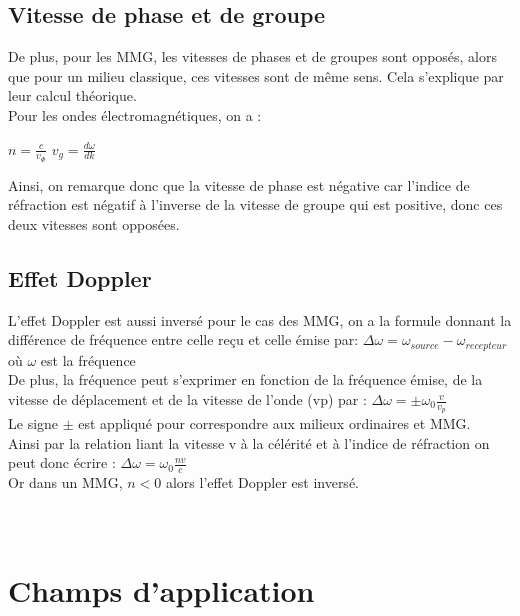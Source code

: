 \documentclass[12pt,a4paper]{article}
\begin{document}
	\subsection{Vitesse de phase et de groupe}
	De plus, pour les MMG, les vitesses de phases et de groupes sont opposés, alors que pour un milieu classique, ces vitesses sont de même sens. Cela s’explique par leur calcul théorique.\\ Pour les ondes électromagnétiques, on a :\\
\begin{center}
\large \textbf{$n=\frac{c}{v_{\Phi}}$} \hspace{4cm} \textbf{$v_{g}=\frac{d\omega}{dk}$}\normalsize
\end{center} 
Ainsi, on remarque donc que la vitesse de phase est négative car l'indice de réfraction est négatif à l'inverse de la vitesse de groupe qui est positive, donc ces deux vitesses sont opposées. \cite{Raffy}
	\subsection{Effet Doppler}
	L’effet Doppler est aussi inversé pour le cas des MMG, on a la formule donnant la différence de fréquence entre celle reçu et celle émise par:\hspace{0.5cm} \large \textbf{$\Delta\omega=\omega_{source}-\omega_{recepteur}$}\normalsize \hspace{0.2cm}
	où $\omega$ est la fréquence\\ 
	
	De plus, la fréquence peut s’exprimer en fonction de la fréquence émise, de la vitesse de déplacement et de la vitesse de l’onde (vp) par : \hspace{0.5cm} \large \textbf{$\Delta\omega = \pm\omega_{0}\frac{v}{v_{p}}$}\normalsize \\
	Le signe $\pm$ est appliqué pour correspondre aux milieux ordinaires et MMG.\\
	
	Ainsi par la relation liant la vitesse v à la célérité et à l’indice de réfraction on peut donc écrire :\hspace{5cm} \large \textbf{$\Delta\omega=\omega_{0}\frac{nv}{c}$} \normalsize \\
	Or dans un MMG, $n<0$ alors l’effet Doppler est inversé.\cite{Lee}\\ \\ \\
	
\section{Champs d'application}
\end{document}
